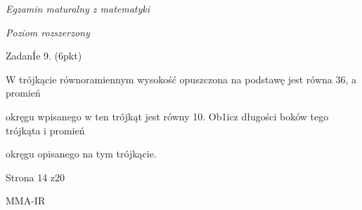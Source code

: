 \documentclass[a4paper,12pt]{article}
\begin{document}
{\it Egzamin maturalny z matematyki}

{\it Poziom rozszerzony}

ZadanÍe 9. (6pkt)

W trójkącie równoramiennym wysokość opuszczona na podstawę jest równa 36, a promień

okręgu wpisanego w ten trójkąt jest równy 10. Ob1icz długości boków tego trójkąta i promień

okręgu opisanego na tym trójkącie.

Strona 14 z20

MMA-IR
\end{document}
